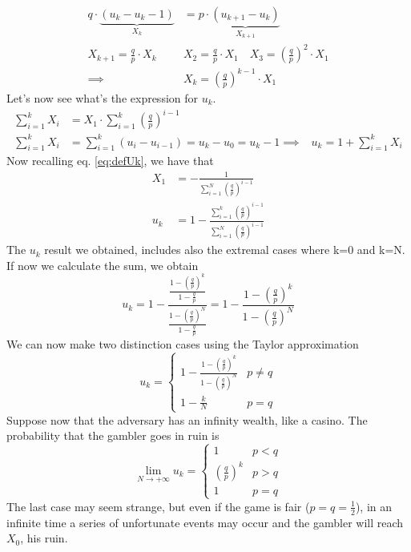 \begin{equation}\begin{split}
q \cdot \underbrace{(u_k - u_k-1)}_{X_k} &= p \cdot \underbrace{\left(u_{k+1} -u_k\right)}_{X_{k+1}} \\
X_{k+1} = \frac{q}{p}\cdot X_k \quad & X_{2} = \frac{q}{p}\cdot X_1 \quad X_{3} = \left(\frac{q}{p}\right)^2 \cdot X_1\\
\implies & X_{k} = \left(\frac{q}{p}\right)^{k-1}\cdot X_1
\end{split}\end{equation}
Let's now see what's the expression for $u_k$.
\begin{equation}\begin{split}
	\sum\limits_{i=1}^{k}X_i &= X_1 \cdot \sum\limits_{i=1}^{k}\left(\frac{q}{p}\right)^{i-1} \\
	\sum\limits_{i=1}^{k}X_i &= \sum\limits_{i=1}^{k}(u_i-u_{i-1}) = u_k - u_0 = u_k -1
	\implies & u_k = 1+ \sum\limits_{i=1}^k X_i
\end{split}\end{equation}
Now recalling eq. \eqref{eq:defUk}, we have that
\begin{equation}\begin{split}
	X_1 &= -\frac{1}{\sum\limits_{i=1}^N \left(\frac{q}{p}\right)^{i-1}}\\
	u_k &= 1- \frac{\sum\limits_{i=1}^k\left(\frac{q}{p}\right)^{i-1}}{\sum\limits_{i=1}^N\left(\frac{q}{p}\right)^{i-1}}
\end{split}\end{equation}
The $u_k$ result we obtained, includes also the extremal cases where k=0 and k=N.\\
If now we calculate the sum, we obtain
\begin{equation}
	u_k = 1- \frac{\frac{1-\left(\frac{q}{p}\right)^k}{1-\frac{q}{p}}}{\frac{1-\left(\frac{q}{p}\right)^N}{1-\frac{q}{p}}}=
	1-\frac{1-\left(\frac{q}{p}\right)^k}{1-\left(\frac{q}{p}\right)^N}
\end{equation}
We can now make two distinction cases using the Taylor approximation
\begin{equation}u_k=\begin{cases}
	1-\frac{1-\left(\frac{q}{p}\right)^k}{1-\left(\frac{q}{p}\right)^N} & p \neq q \\
	1-\frac{k}{N} & p=q
\end{cases}\end{equation}
Suppose now that the adversary has an infinity wealth, like a casino. The probability
that the gambler goes in ruin is
\begin{equation}
	\lim_{N \to +\infty} u_k =
	\begin{cases}
		1 & p<q \\
		\left(\frac{q}{p}\right)^k & p>q\\
		1 & p=q
\end{cases}\end{equation}
The last case may seem strange, but even if the game is fair ($p=q=\frac{1}{2}$), in an infinite time
a series of unfortunate events may occur and the gambler will reach $X_0$, his ruin.

